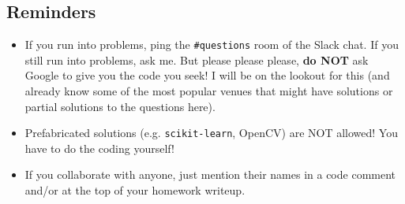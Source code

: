 \documentclass[paper=a4, fontsize=11pt]{scrartcl} %
\numberwithin{figure}{section} %
\numberwithin{table}{section} %
\begin{document}
\subsection{Reminders}

\begin{itemize}
	\item If you run into problems, ping the \texttt{\#questions} room of the Slack chat. If you still run into problems, ask me. But please please please, \textbf{do NOT} ask Google to give you the code you seek! I will be on the lookout for this (and already know some of the most popular venues that might have solutions or partial solutions to the questions here).
	\item Prefabricated solutions (e.g. \texttt{scikit-learn}, OpenCV) are NOT allowed! You have to do the coding yourself!
	\item If you collaborate with anyone, just mention their names in a code comment and/or at the top of your homework writeup.
\end{itemize}
\end{document}
